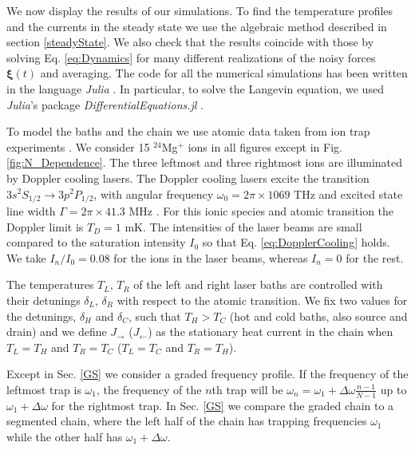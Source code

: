 We now display the results of our simulations. To find the temperature profiles and the currents in the steady state we use the algebraic method described in section \ref{steadyState}. We also check that the results coincide with those by solving Eq. \eqref{eq:Dynamics} for many different realizations of the noisy forces $\bm\xi (t)$ and averaging. The code for all the numerical simulations has been written in the language \textit{Julia} \cite{Bezanson2012,Bezanson2017}. In particular, to solve the Langevin equation, we used \textit{Julia}'s package \textit{DifferentialEquations.jl} \cite{Rackauckas2017}.

To model the baths and the chain we use atomic data taken from ion trap experiments \cite{Leupold2015,Lo2015}. We consider 15 $^{24}$Mg$^+$ ions in all figures except in Fig. \ref{fig:N_Dependence}. The three leftmost and three rightmost ions are illuminated by Doppler cooling lasers. The Doppler cooling lasers excite the transition $3s^2S_{1/2}\rightarrow 3p^2P_{1/2}$, with angular frequency $\omega_0 = 2 \pi \times 1069$ THz and excited state line width $\Gamma = 2\pi \times 41.3$ MHz \cite{Ruiz2014}. For this ionic species and atomic transition the Doppler limit is $T_D = 1$ mK.
The intensities of the laser beams are small compared to the saturation intensity $I_0$ so that Eq. \eqref{eq:DopplerCooling} holds. We take $I_n/I_0 = 0.08$ for the ions  in the laser beams, whereas  $I_n=0$ for the rest.

The temperatures $T_L,\,T_R$ of the left and right laser baths are controlled with their detunings $\delta_L,\,\delta_R$ with respect to the atomic transition. We fix two values for the detunings, $\delta_H$ and $\delta_C$, such that $T_H>T_C$ (hot and cold baths, also source and drain) and we define $J_\rightarrow$ ($J_\leftarrow$) as the stationary heat current in the chain when $T_L = T_H$ and $T_R = T_C$ ($T_L = T_C$ and $T_R = T_H$).

Except in Sec. \ref{GS} we consider a graded frequency profile.
If the frequency of the leftmost trap is $\omega_1$, the frequency of the $n$th trap will be $\omega_n = \omega_1 +\Delta\omega\frac{n-1}{N-1}$ up to $\omega_1 +\Delta\omega$ for the rightmost trap. In
Sec. \ref{GS} we compare the graded chain to a segmented chain, where the left half of the chain has trapping frequencies $\omega_1$ while the other half has $\omega_1 +\Delta\omega$.


